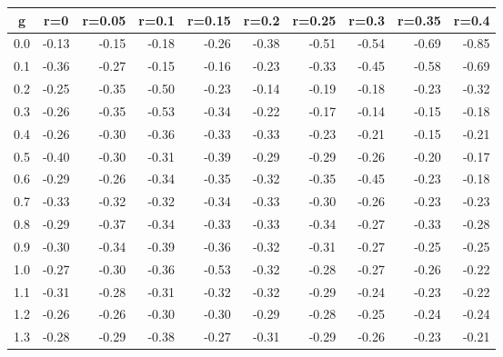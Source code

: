 %
\begin{table}[!tbp]
 \begin{center}
 \begin{tabular}{rrrrrrrrrr}\hline\hline
\multicolumn{1}{c}{g}&\multicolumn{1}{c}{r=0}&\multicolumn{1}{c}{r=0.05}&\multicolumn{1}{c}{r=0.1}&\multicolumn{1}{c}{r=0.15}&\multicolumn{1}{c}{r=0.2}&\multicolumn{1}{c}{r=0.25}&\multicolumn{1}{c}{r=0.3}&\multicolumn{1}{c}{r=0.35}&\multicolumn{1}{c}{r=0.4}\tabularnewline
\hline
0.0&-0.13&-0.15&-0.18&-0.26&-0.38&-0.51&-0.54&-0.69&-0.85\tabularnewline
0.1&-0.36&-0.27&-0.15&-0.16&-0.23&-0.33&-0.45&-0.58&-0.69\tabularnewline
0.2&-0.25&-0.35&-0.50&-0.23&-0.14&-0.19&-0.18&-0.23&-0.32\tabularnewline
0.3&-0.26&-0.35&-0.53&-0.34&-0.22&-0.17&-0.14&-0.15&-0.18\tabularnewline
0.4&-0.26&-0.30&-0.36&-0.33&-0.33&-0.23&-0.21&-0.15&-0.21\tabularnewline
0.5&-0.40&-0.30&-0.31&-0.39&-0.29&-0.29&-0.26&-0.20&-0.17\tabularnewline
0.6&-0.29&-0.26&-0.34&-0.35&-0.32&-0.35&-0.45&-0.23&-0.18\tabularnewline
0.7&-0.33&-0.32&-0.32&-0.34&-0.33&-0.30&-0.26&-0.23&-0.23\tabularnewline
0.8&-0.29&-0.37&-0.34&-0.33&-0.33&-0.34&-0.27&-0.33&-0.28\tabularnewline
0.9&-0.30&-0.34&-0.39&-0.36&-0.32&-0.31&-0.27&-0.25&-0.25\tabularnewline
1.0&-0.27&-0.30&-0.36&-0.53&-0.32&-0.28&-0.27&-0.26&-0.22\tabularnewline
1.1&-0.31&-0.28&-0.31&-0.32&-0.32&-0.29&-0.24&-0.23&-0.22\tabularnewline
1.2&-0.26&-0.26&-0.30&-0.30&-0.29&-0.28&-0.25&-0.24&-0.24\tabularnewline
1.3&-0.28&-0.29&-0.38&-0.27&-0.31&-0.29&-0.26&-0.23&-0.21\tabularnewline
\hline
\end{tabular}

\end{center}

\end{table}

